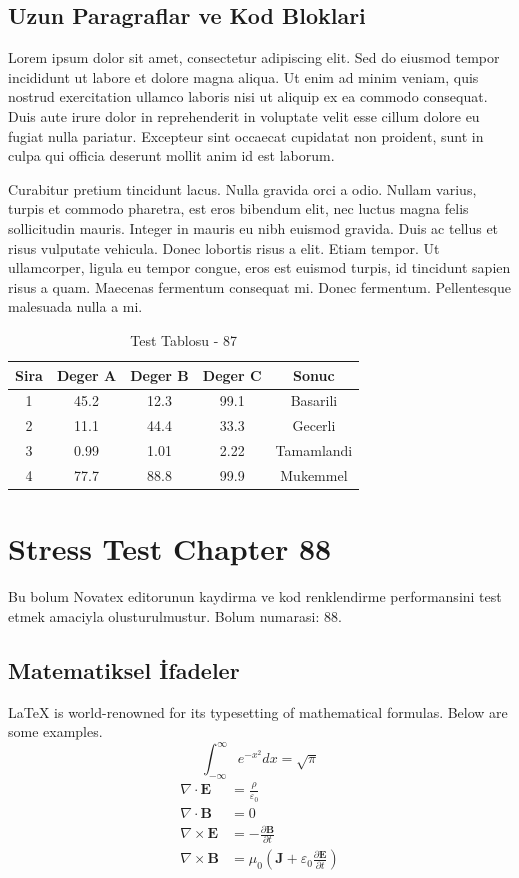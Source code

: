 \documentclass[12pt,a4paper]{article}
\begin{document}
\subsection{Uzun Paragraflar ve Kod Bloklari}
Lorem ipsum dolor sit amet, consectetur adipiscing elit. Sed do eiusmod tempor incididunt ut labore et dolore magna aliqua. Ut enim ad minim veniam, quis nostrud exercitation ullamco laboris nisi ut aliquip ex ea commodo consequat. Duis aute irure dolor in reprehenderit in voluptate velit esse cillum dolore eu fugiat nulla pariatur. Excepteur sint occaecat cupidatat non proident, sunt in culpa qui officia deserunt mollit anim id est laborum.

Curabitur pretium tincidunt lacus. Nulla gravida orci a odio. Nullam varius, turpis et commodo pharetra, est eros bibendum elit, nec luctus magna felis sollicitudin mauris. Integer in mauris eu nibh euismod gravida. Duis ac tellus et risus vulputate vehicula. Donec lobortis risus a elit. Etiam tempor. Ut ullamcorper, ligula eu tempor congue, eros est euismod turpis, id tincidunt sapien risus a quam. Maecenas fermentum consequat mi. Donec fermentum. Pellentesque malesuada nulla a mi.

\begin{table}[h!]
\centering
\begin{tabular}{|c|c|c|c|c|}
\hline
\textbf{Sira} & \textbf{Deger A} & \textbf{Deger B} & \textbf{Deger C} & \textbf{Sonuc} \\
\hline
1 & 45.2 & 12.3 & 99.1 & Basarili \\
2 & 11.1 & 44.4 & 33.3 & Gecerli \\
3 & 0.99 & 1.01 & 2.22 & Tamamlandi \\
4 & 77.7 & 88.8 & 99.9 & Mukemmel \\
\hline
\end{tabular}
\caption{Test Tablosu - 87}
\end{table}

\newpage
\section{Stress Test Chapter 88}
Bu bolum Novatex editorunun kaydirma ve kod renklendirme performansini test etmek amaciyla olusturulmustur. Bolum numarasi: 88.

\subsection{Matematiksel İfadeler}
\LaTeX{} is world-renowned for its typesetting of mathematical formulas. Below are some examples.
\begin{equation}
\int_{-\infty}^{\infty} e^{-x^2} dx = \sqrt{\pi}
\end{equation}
\begin{align}
\nabla \cdot \mathbf{E} &= \frac{\rho}{\varepsilon_0} \\
\nabla \cdot \mathbf{B} &= 0 \\
\nabla \times \mathbf{E} &= -\frac{\partial \mathbf{B}}{\partial t} \\
\nabla \times \mathbf{B} &= \mu_0\left(\mathbf{J} + \varepsilon_0 \frac{\partial \mathbf{E}}{\partial t}\right)
\end{align}
\end{document}
